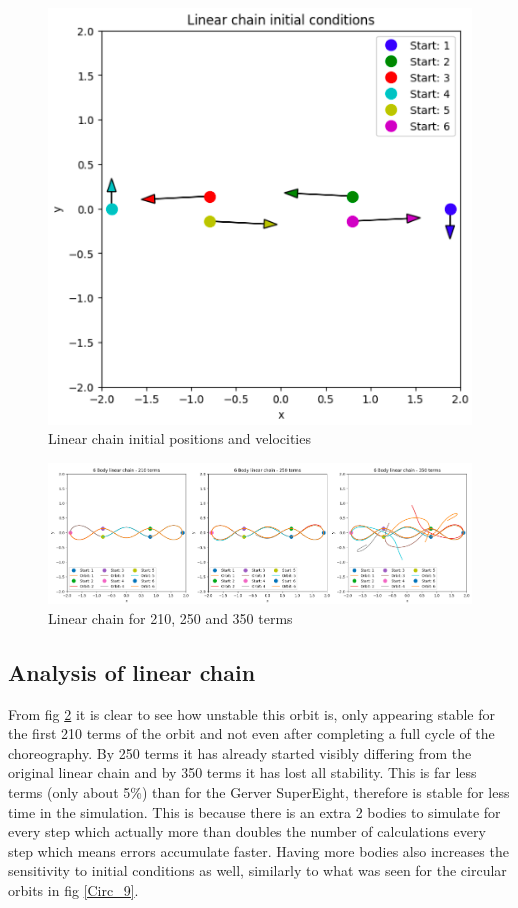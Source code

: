 \documentclass[11pt]{article}
\begin{document}
\begin{figure}[ht]
\centerline{\includegraphics[scale=0.35]{Pictures/LinearChain_init.png}}
\caption{Linear chain initial positions and velocities}
\label{LinearChain_init}
\end{figure}

\begin{figure}[ht]
\centerline{\includegraphics[scale=0.35]{Pictures/LinearChain.png}}
\caption{Linear chain for 210, 250 and 350 terms}
\label{LinearChain}
\end{figure}


\newpage


\subsection{Analysis of linear chain}

From fig \ref{LinearChain} it is clear to see how unstable this orbit is, only appearing stable for the first 210 terms of the orbit and not even after completing a full cycle of the choreography. By 250 terms it has already started visibly differing from the original linear chain and by 350 terms it has lost all stability. This is far less terms (only about 5\%) than for the Gerver SuperEight, therefore is stable for less time in the simulation. This is because there is an extra 2 bodies to simulate for every step which actually more than doubles the number of calculations every step which means errors accumulate faster. Having more bodies also increases the sensitivity to initial conditions as well, similarly to what was seen for the circular orbits in fig \ref{Circ_9}.
\end{document}
